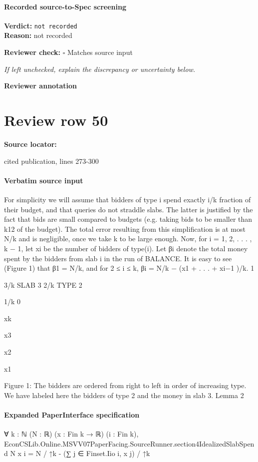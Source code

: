 \documentclass[10pt]{article}
\newcommand{\reviewerbox}{%
  \par\noindent\fbox{\parbox{0.96\linewidth}{\rule{0pt}{0.38in}}}\par
}
\newcommand{\reviewmatch}[1]{%
  \par\noindent\textbf{Reviewer check:} $\square$\; #1\par
  \noindent\emph{If left unchecked, explain the discrepancy or uncertainty below.}\par
}
\begin{document}
\paragraph{Recorded source-to-Spec screening}
\textbf{Verdict:} \texttt{not recorded}
\\
\textbf{Reason:} not recorded
\reviewmatch{Matches source input}
\noindent\textbf{Reviewer annotation}\par
\reviewerbox
\clearpage
\hypertarget{source-claim-f6228eecafce362c}{}
\section*{Review row 50}
\textbf{Source locator:} {\footnotesize\raggedright cited publication, lines 273-\allowbreak{}300\par}
\paragraph{Verbatim source input}
\begin{ReviewVerbatim}
For simplicity we will assume that bidders of type i spend exactly i/k fraction of their budget,
and that queries do not straddle slabs. The latter is justified by the fact that bids are small
compared to budgets (e.g. taking bids to be smaller than k12 of the budget). The total error
resulting from this simplification is at most N/k and is negligible, once we take k to be large
enough. Now, for i = 1, 2, . . . , k − 1, let xi be the number of bidders of type(i). Let βi denote
the total money spent by the bidders from slab i in the run of BALANCE. It is easy to see
(Figure 1) that β1 = N/k, and for 2 ≤ i ≤ k, βi = N/k − (x1 + . . . + xi−1 )/k.
1

3/k
SLAB 3
2/k
TYPE 2

1/k
0

xk

x3

x2

x1

Figure 1: The bidders are ordered from right to left in order of increasing type. We have labeled here
the bidders of type 2 and the money in slab 3.
Lemma 2
\end{ReviewVerbatim}


\paragraph{Expanded PaperInterface specification}
\begin{ReviewVerbatim}
∀ {k : ℕ} (N : ℝ) (x : Fin k → ℝ) (i : Fin k),
  EconCSLib.Online.MSVV07PaperFacing.SourceRunner.section4IdealizedSlabSpend N x i =
    N / ↑k - (∑ j ∈ Finset.Iio i, x j) / ↑k
\end{ReviewVerbatim}
\end{document}
